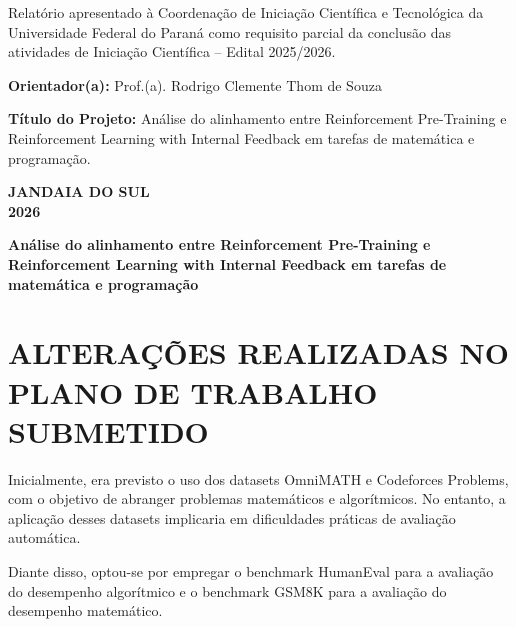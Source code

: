 \documentclass[11pt,a4paper]{article}
\begin{document}
\begin{flushright}
\begin{minipage}{0.6\textwidth}
    \small
    \singlespacing
    Relatório apresentado à Coordenação de Iniciação Científica e Tecnológica da Universidade Federal do Paraná como requisito parcial da conclusão das atividades de Iniciação Científica – Edital 2025/2026.
    
    \vspace{0.3cm}
    \textbf{Orientador(a):} Prof.(a). Rodrigo Clemente Thom de Souza
    
    \vspace{0.3cm}
    \textbf{Título do Projeto:} Análise do alinhamento entre Reinforcement Pre-Training e Reinforcement Learning with Internal Feedback em tarefas de matemática e programação.
\end{minipage}
\end{flushright}

\vfill

\begin{center}
    \textbf{JANDAIA DO SUL} \\
    \textbf{2026}
\end{center}

\newpage

\begin{center}
    \textbf{\large Análise do alinhamento entre Reinforcement Pre-Training e Reinforcement Learning with Internal Feedback em tarefas de matemática e programação}
\end{center}
\vspace{1cm}

\section{ALTERAÇÕES REALIZADAS NO PLANO DE TRABALHO SUBMETIDO}

Inicialmente, era previsto o uso dos datasets OmniMATH e Codeforces Problems, com o objetivo de abranger problemas matemáticos e algorítmicos. No entanto, a aplicação desses datasets implicaria em dificuldades práticas de avaliação automática.

Diante disso, optou-se por empregar o benchmark HumanEval para a avaliação do desempenho algorítmico e o benchmark GSM8K para a avaliação do desempenho matemático.
\end{document}
